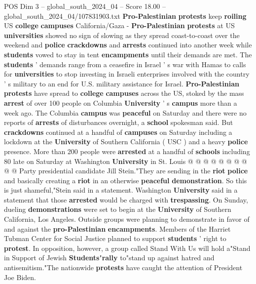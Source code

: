 \begin{textsample}{POS Dim 3 – global\_south\_2024\_04 – Score 18.00 – global\_south\_2024\_04/107831903.txt}  \label{ex:f3_pos_216}
\textbf{Pro-Palestinian} \textbf{protests} keep \textbf{roiling} US \textbf{college} \textbf{campuses} California/Gaza - \textbf{Pro-Palestinian} \textbf{protests} at US \textbf{universities} showed no sign of slowing as they spread coast-to-coast over the weekend and \textbf{police} \textbf{crackdowns} and \textbf{arrests} continued into another week while \textbf{students} vowed to stay in tent \textbf{encampments} until their demands are met.
The \textbf{students} ' demands range from a ceasefire in Israel ' s war with Hamas to calls for \textbf{universities} to stop investing in Israeli enterprises involved with the country ' s military to an end for U.S. military assistance for Israel. \textbf{Pro-Palestinian} \textbf{protests} have spread to \textbf{college} \textbf{campuses} across the US, stoked by the mass \textbf{arrest} of over 100 people on Columbia \textbf{University} ' s \textbf{campus} more than a week ago.
The Columbia \textbf{campus} was \textbf{peaceful} on Saturday and there were no reports of \textbf{arrests} of disturbances overnight, a \textbf{school} spokesman said.
But \textbf{crackdowns} continued at a handful of \textbf{campuses} on Saturday including a lockdown at the \textbf{University} of Southern California ( USC ) and a heavy \textbf{police} presence.
More than 200 people were \textbf{arrested} at a handful of \textbf{schools} including 80 late on Saturday at Washington \textbf{University} in St.
Louis @ @ @ @ @ @ @ @ @ @ Party presidential candidate Jill Stein."They are sending in the \textbf{riot} \textbf{police} and basically creating a \textbf{riot} in an otherwise \textbf{peaceful} \textbf{demonstration}.
So this is just shameful,"Stein said in a statement.
Washington \textbf{University} said in a statement that those \textbf{arrested} would be charged with \textbf{trespassing}.
On Sunday, dueling \textbf{demonstrations} were set to begin at the \textbf{University} of Southern California, Los Angeles.
Outside groups were planning to demonstrate in favor of and against the \textbf{pro-Palestinian} \textbf{encampments}.
Members of the Harriet Tubman Center for Social Justice planned to support \textbf{students} ' right to \textbf{protest}.
In opposition, however, a group called Stand With Us will hold a"Stand in Support of Jewish \textbf{Students}"\textbf{rally} to"stand up against hatred and antisemitism."The nationwide \textbf{protests} have caught the attention of President Joe Biden.

\end{textsample}

